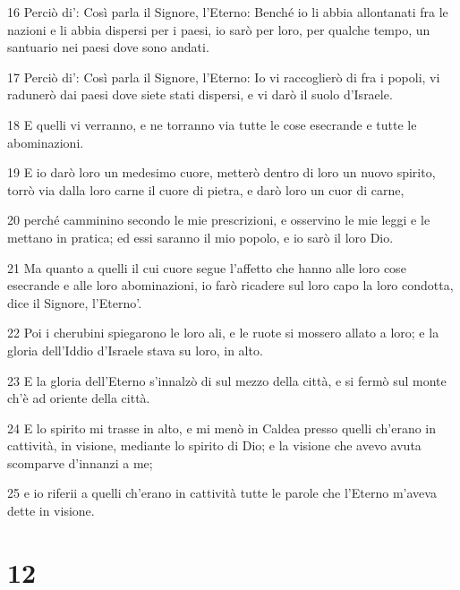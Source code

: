 \par 16 Perciò di': Così parla il Signore, l'Eterno: Benché io li abbia allontanati fra le nazioni e li abbia dispersi per i paesi, io sarò per loro, per qualche tempo, un santuario nei paesi dove sono andati.
\par 17 Perciò di': Così parla il Signore, l'Eterno: Io vi raccoglierò di fra i popoli, vi radunerò dai paesi dove siete stati dispersi, e vi darò il suolo d'Israele.
\par 18 E quelli vi verranno, e ne torranno via tutte le cose esecrande e tutte le abominazioni.
\par 19 E io darò loro un medesimo cuore, metterò dentro di loro un nuovo spirito, torrò via dalla loro carne il cuore di pietra, e darò loro un cuor di carne,
\par 20 perché camminino secondo le mie prescrizioni, e osservino le mie leggi e le mettano in pratica; ed essi saranno il mio popolo, e io sarò il loro Dio.
\par 21 Ma quanto a quelli il cui cuore segue l'affetto che hanno alle loro cose esecrande e alle loro abominazioni, io farò ricadere sul loro capo la loro condotta, dice il Signore, l'Eterno'.
\par 22 Poi i cherubini spiegarono le loro ali, e le ruote si mossero allato a loro; e la gloria dell'Iddio d'Israele stava su loro, in alto.
\par 23 E la gloria dell'Eterno s'innalzò di sul mezzo della città, e si fermò sul monte ch'è ad oriente della città.
\par 24 E lo spirito mi trasse in alto, e mi menò in Caldea presso quelli ch'erano in cattività, in visione, mediante lo spirito di Dio; e la visione che avevo avuta scomparve d'innanzi a me;
\par 25 e io riferii a quelli ch'erano in cattività tutte le parole che l'Eterno m'aveva dette in visione.

\chapter{12}

